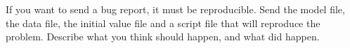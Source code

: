 \documentclass[11pt, a4paper, titlepage]{report}
\newcommand{\biips}{\textsf{BiiPS}}
\newcommand{\BUGS}{\textsf{BUGS}}
\begin{document}
If you want to send a bug report, it must be reproducible. Send the
model file, the data file, the initial value file and a script file
that will reproduce the problem. Describe what you think should
happen, and what did happen.

% 
\end{document}
